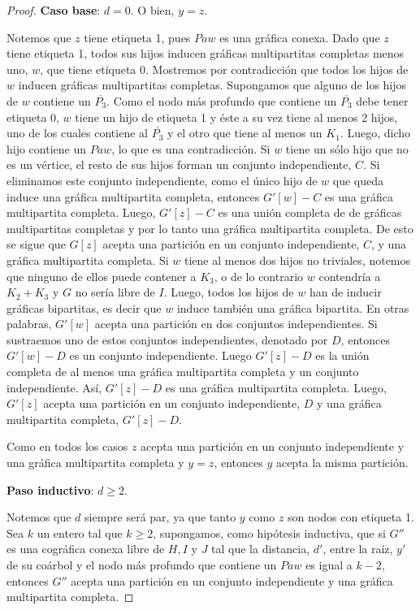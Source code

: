 \begin{proof}
    \textbf{Caso base}: $d = 0$. O bien, $y = z$.

    Notemos que $z$ tiene etiqueta 1, pues $Paw$ es una gráfica conexa. Dado que $z$ tiene etiqueta 1, todos sus hijos inducen gráficas multipartitas completas menos uno, $w$, que tiene etiqueta 0. Mostremos por contradicción que todos los hijos de $w$ inducen gráficas multipartitas completas. Supongamos que alguno de los hijos de $w$ contiene un $\overline{P_3}$. Como el nodo más profundo que contiene un $\overline{P_3}$ debe tener etiqueta 0, $w$ tiene un hijo de etiqueta 1 y éste a su vez tiene al menos 2 hijos, uno de los cuales contiene al $\overline{P_3}$ y el otro que tiene al menos un $K_1$. Luego, dicho hijo contiene un $Paw$, lo que es una contradicción. Si $w$ tiene un sólo hijo que no es un vértice, el resto de sus hijos forman un conjunto independiente, $C$. Si eliminamos este conjunto independiente, como el único hijo de $w$ que queda induce una gráfica multipartita completa, entonces $G'[w] - C$ es una gráfica multipartita completa. Luego, $G'[z] - C$ es una unión completa de de gráficas multipartitas completas y por lo tanto una gráfica multipartita completa. De esto se sigue que $G[z]$ acepta una partición en un conjunto independiente, $C$, y una gráfica multipartita completa. Si $w$ tiene al menos dos hijos no triviales, notemos que ninguno de ellos puede contener a $K_3$, o de lo contrario $w$ contendría a $K_2+K_3$ y $G$ no sería libre de $I$. Luego, todos los hijos de $w$ han de inducir gráficas bipartitas, es decir que $w$ induce también una gráfica bipartita. En otras palabras, $G'[w]$ acepta una partición en dos conjuntos independientes. Si sustraemos uno de estos conjuntos independientes, denotado por $D$, entonces $G'[w]-D$ es un conjunto independiente. Luego $G'[z]-D$ es la unión completa de al menos una gráfica multipartita completa y un conjunto independiente. Así, $G'[z]-D$ es una gráfica multipartita completa. Luego, $G'[z]$ acepta una partición en un conjunto independiente, $D$ y una gráfica multipartita completa, $G'[z] - D$.

    Como en todos los casos $z$ acepta una partición en un conjunto independiente y una gráfica multipartita completa y $y = z$, entonces $y$ acepta la misma partición.

    \textbf{Paso inductivo}: $d \geq 2$.

    Notemos que $d$ siempre será par, ya que tanto $y$ como $z$ son nodos con etiqueta 1. Sea $k$ un entero tal que $k \geq 2$, supongamos, como hipótesis inductiva, que si $G''$ es una cográfica conexa libre de $H, I$ y $J$ tal que la distancia, $d'$, entre la raíz, $y'$ de su coárbol y el nodo más profundo que contiene un $Paw$ es igual a $k-2$, entonces $G''$ acepta una partición en un conjunto independiente y una gráfica multipartita completa.


\end{proof}
